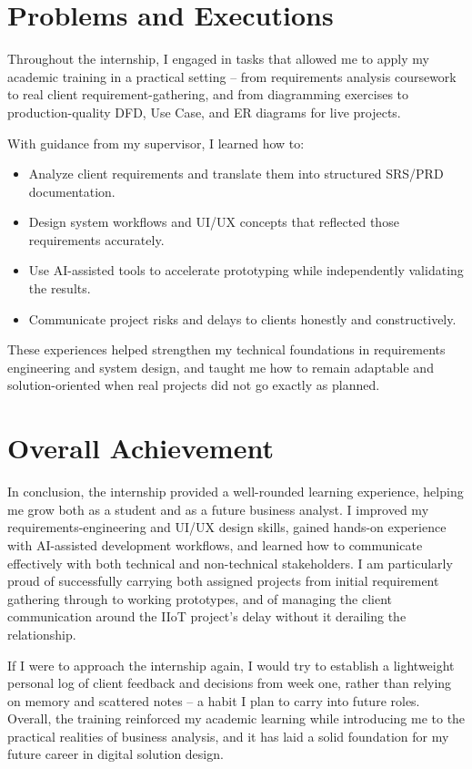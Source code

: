 \section{Problems and Executions}
\par Throughout the internship, I engaged in tasks that allowed me to apply my academic training in a practical setting -- from requirements analysis coursework to real client requirement-gathering, and from diagramming exercises to production-quality DFD, Use Case, and ER diagrams for live projects.

\par With guidance from my supervisor, I learned how to:
\begin{itemize}
    \item Analyze client requirements and translate them into structured SRS/PRD documentation.
    \item Design system workflows and UI/UX concepts that reflected those requirements accurately.
    \item Use AI-assisted tools to accelerate prototyping while independently validating the results.
    \item Communicate project risks and delays to clients honestly and constructively.
\end{itemize}

\par These experiences helped strengthen my technical foundations in requirements engineering and system design, and taught me how to remain adaptable and solution-oriented when real projects did not go exactly as planned.

\section{Overall Achievement}
\par In conclusion, the internship provided a well-rounded learning experience, helping me grow both as a student and as a future business analyst. I improved my requirements-engineering and UI/UX design skills, gained hands-on experience with AI-assisted development workflows, and learned how to communicate effectively with both technical and non-technical stakeholders. I am particularly proud of successfully carrying both assigned projects from initial requirement gathering through to working prototypes, and of managing the client communication around the IIoT project's delay without it derailing the relationship.

\par If I were to approach the internship again, I would try to establish a lightweight personal log of client feedback and decisions from week one, rather than relying on memory and scattered notes -- a habit I plan to carry into future roles. Overall, the training reinforced my academic learning while introducing me to the practical realities of business analysis, and it has laid a solid foundation for my future career in digital solution design.
